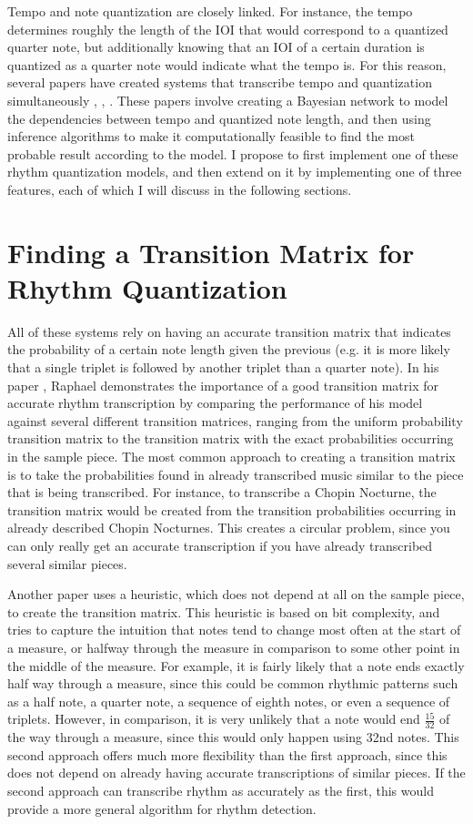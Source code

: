 \documentclass[11pt]{article}
\begin{document}
Tempo and note quantization are closely linked. For instance, the tempo determines roughly the length of the IOI that would correspond to a quantized quarter note, but additionally knowing that an IOI of a certain duration is quantized as a quarter note would indicate what the tempo is. For this reason, several papers have created systems that transcribe tempo and quantization simultaneously \cite{raphael}, \cite{barpointer}, \cite{nakamura}. These papers involve creating a Bayesian network to model the dependencies between tempo and quantized note length, and then using inference algorithms to make it computationally feasible to find the most probable result according to the model. I propose to first implement one of these rhythm quantization models, and then extend on it by implementing one of three features, each of which I will discuss in the following sections.


\section{Finding a Transition Matrix for Rhythm Quantization} 
All of these systems rely on having an accurate transition matrix that indicates the probability of a certain note length given the previous (e.g. it is more likely that a single triplet is followed by another triplet than a quarter note). In his paper \cite{raphael}, Raphael demonstrates the importance of a good transition matrix for accurate rhythm transcription by comparing the performance of his model against several different transition matrices, ranging from the uniform probability transition matrix to the transition matrix with the exact probabilities occurring in the sample piece. The most common approach to creating a transition matrix is to take the probabilities found in already transcribed music similar to the piece that is being transcribed. For instance, to transcribe a Chopin Nocturne, the transition matrix would be created from the transition probabilities occurring in already described Chopin Nocturnes. This creates a circular problem, since you can only really get an accurate transcription if you have already transcribed several similar pieces. 

Another paper \cite{cemgil} uses a heuristic, which does not depend at all on the sample piece, to create the transition matrix. This heuristic is based on bit complexity, and tries to capture the intuition that notes tend to change most often at the start of a measure, or halfway through the measure in comparison to some other point in the middle of the measure. For example, it is fairly likely that a note ends exactly half way through a measure, since this could be common rhythmic patterns such as a half note, a quarter note, a sequence of eighth notes, or even a sequence of triplets. However, in comparison, it is very unlikely that a note would end $\frac{15}{32}$ of the way through a measure, since this would only happen using 32nd notes. This second approach offers much more flexibility than the first approach, since this does not depend on already having accurate transcriptions of similar pieces. If the second approach can transcribe rhythm as accurately as the first, this would provide a more general algorithm for rhythm detection.
\end{document}
